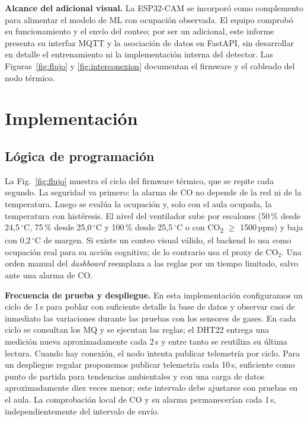 \documentclass[10pt,a4paper]{article}
\newcommand{\COd}{CO\textsubscript{2}}
\begin{document}
\textbf{Alcance del adicional visual.} La ESP32-CAM se incorporó como complemento para alimentar el modelo de ML con ocupación observada. El equipo comprobó su funcionamiento y el envío del conteo; por ser un adicional, este informe presenta su interfaz MQTT y la asociación de datos en FastAPI, sin desarrollar en detalle el entrenamiento ni la implementación interna del detector. Las Figuras~\ref{fig:flujo} y \ref{fig:interconexion} documentan el firmware y el cableado del nodo térmico.

\section{Implementación}
\subsection{Lógica de programación}
La Fig.~\ref{fig:flujo} muestra el ciclo del firmware térmico, que se repite cada segundo. La seguridad va primero: la alarma de CO no depende de la red ni de la temperatura. Luego se evalúa la ocupación y, solo con el aula ocupada, la temperatura con histéresis. El nivel del ventilador sube por escalones (50\,\% desde 24,5\,$^\circ$C, 75\,\% desde 25,0\,$^\circ$C y 100\,\% desde 25,5\,$^\circ$C o con \COd{} $\geq$ 1500\,ppm) y baja con 0,2\,$^\circ$C de margen. Si existe un conteo visual válido, el backend lo usa como ocupación real para su acción cognitiva; de lo contrario usa el proxy de CO$_2$. Una orden manual del \emph{dashboard} reemplaza a las reglas por un tiempo limitado, salvo ante una alarma de CO.

\textbf{Frecuencia de prueba y despliegue.} En esta implementación configuramos un ciclo de 1\,s para poblar con suficiente detalle la base de datos y observar casi de inmediato las variaciones durante las pruebas con los sensores de gases. En cada ciclo se consultan los MQ y se ejecutan las reglas; el DHT22 entrega una medición nueva aproximadamente cada 2\,s y entre tanto se reutiliza su última lectura. Cuando hay conexión, el nodo intenta publicar telemetría por ciclo. Para un despliegue regular proponemos publicar telemetría cada 10\,s, suficiente como punto de partida para tendencias ambientales y con una carga de datos aproximadamente diez veces menor; este intervalo debe ajustarse con pruebas en el aula. La comprobación local de CO y su alarma permanecerían cada 1\,s, independientemente del intervalo de envío.
\end{document}
